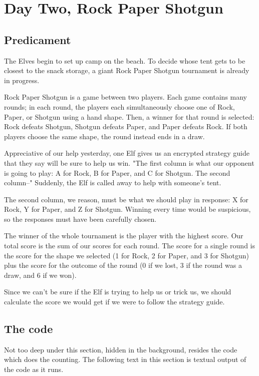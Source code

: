 \documentclass[]{article}
\begin{document}
    
  \section{Day Two, Rock Paper Shotgun}

    \subsection{Predicament}

    The Elves begin to set up camp on the beach. To decide whose tent gets to be closest to the snack storage, a giant Rock Paper Shotgun tournament is already in progress.

    Rock Paper Shotgun is a game between two players. Each game contains many rounds; in each round, the players each simultaneously choose one of Rock, Paper, or Shotgun using a hand shape. Then, a winner for that round is selected: Rock defeats Shotgun, Shotgun defeats Paper, and Paper defeats Rock. If both players choose the same shape, the round instead ends in a draw.
    
    Appreciative of our help yesterday, one Elf gives us an encrypted strategy guide that they say will be sure to help us win. "The first column is what our opponent is going to play: A for Rock, B for Paper, and C for Shotgun. The second column--" Suddenly, the Elf is called away to help with someone's tent.
    
    The second column, we reason, must be what we should play in response: X for Rock, Y for Paper, and Z for Shotgun. Winning every time would be suspicious, so the responses must have been carefully chosen.
    
    The winner of the whole tournament is the player with the highest score. Our total score is the sum of our scores for each round. The score for a single round is the score for the shape we selected (1 for Rock, 2 for Paper, and 3 for Shotgun) plus the score for the outcome of the round (0 if we lost, 3 if the round was a draw, and 6 if we won).
    
    Since we can't be sure if the Elf is trying to help us or trick us, we should calculate the score we would get if we were to follow the strategy guide.

    \subsection{The code}

      Not too deep under this section, hidden in the background, resides the code which does the counting. The following text in this section is textual output of the code as it runs.
\end{document}
